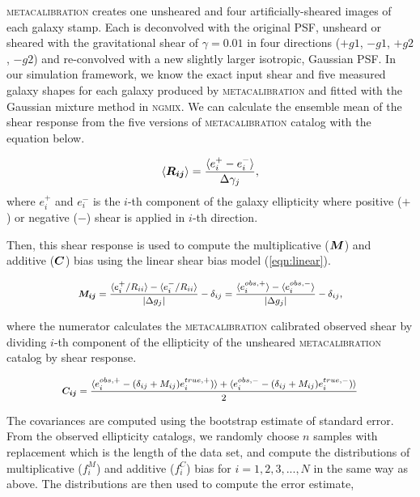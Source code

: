 \documentclass[fleqn,usenatbib]{mnras}
\begin{document}
\textsc{metacalibration} creates one unsheared and four artificially-sheared images of each galaxy stamp. Each is deconvolved with the original PSF, unsheard or sheared with the gravitational shear of $\gamma=0.01$ in four directions ($+g1$, $-g1$, $+g2$, $-g2$) and re-convolved with a new slightly larger isotropic, Gaussian PSF. In our simulation framework, we know the exact input shear and five measured galaxy shapes for each galaxy produced by \textsc{metacalibration} and fitted with the Gaussian mixture method in \textsc{ngmix}. We can calculate the ensemble mean of the shear response from the five versions of \textsc{metacalibration} catalog with the equation below. 


\begin{equation}
    \langle\vb*{R_{ij}}\rangle = 
    \frac{\langle e^{+}_{i} - e^{-}_{i} \rangle}{\Delta\gamma_{j}}, 
\end{equation}
where $e^{+}_{i}$ and $e^{-}_{i}$ is the $i$-th component of the galaxy ellipticity where positive ($+$) or negative ($-$) shear is applied in $i$-th direction. 


Then, this shear response is used to compute the multiplicative ($\vb*{M}$) and additive ($\vb*{C}$) bias using the linear shear bias model (\ref{eqn:linear}). 


\begin{equation}
    \small
    \vb*{M_{ij}} = 
    \frac{\langle e^{+}_{i}/R_{ii} \rangle - \langle e^{-}_{i}/R_{ii} \rangle}{\abs{\Delta g_{j}}} - \delta_{ij} 
    = \frac{\langle e^{obs,+}_{i}\rangle - \langle e^{obs,-}_{i}\rangle}{\abs{\Delta g_{j}}} - \delta_{ij}, 
\end{equation}


where the numerator calculates the \textsc{metacalibration} calibrated observed shear by dividing $i$-th component of the ellipticity of the unsheared \textsc{metacalibration} catalog by shear response.


\begin{equation}
    \small
    \vb*{C_{ij}} = \frac{\langle e^{obs,+}_{i} - (\delta_{ij}+M_{ij})e^{true,+}_{i})\rangle + \langle e^{obs,-}_{i} - (\delta_{ij}+M_{ij})e^{true,-}_{i}) \rangle}{2}
\end{equation}


The covariances are computed using the bootstrap estimate of standard error. From the observed ellipticity catalogs, we randomly choose $n$ samples with replacement which is the length of the data set, and compute the distributions of multiplicative ($f^{M}_{i}$) and additive ($f^{C}_{i}$) bias for $i=1,2,3,...,N$ in the same way as above. The distributions are then used to compute the error estimate,  
\end{document}
